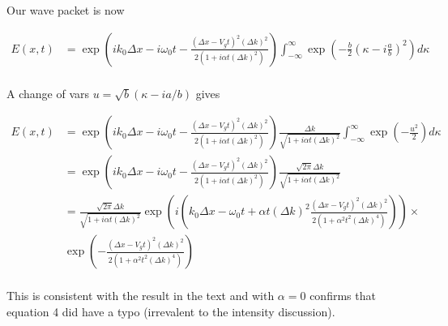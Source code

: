 \documentclass{article}
\newcommand{\IIinf}[0]{ \int_{-\infty}^\infty }
\begin{document}
Our wave packet is now

\begin{align*}
E(x,t) 
&= \exp\left( i k_0 \Delta x -i \omega_0 t - \frac{( \Delta x - V_g t)^2 (\Delta k)^2}{2(1 + i \alpha t (\Delta k)^2)} \right)
\IIinf 
\exp\left( - \frac{b}{2}\left( \kappa - i \frac{a}{b} \right)^2 \right) 
d\kappa \\
\end{align*}

A change of vars $u = \sqrt{b}(\kappa - ia/b)$ gives

\begin{align*}
E(x,t) 
&= \exp\left( i k_0 \Delta x -i \omega_0 t - \frac{( \Delta x - V_g t)^2 (\Delta k)^2}{2(1 + i \alpha t (\Delta k)^2)} \right)
\frac{\Delta k}{\sqrt{1 + i \alpha t (\Delta k)^2}}
\IIinf \exp\left( - \frac{u^2}{2} \right) d\kappa \\
&= \exp\left( i k_0 \Delta x -i \omega_0 t - \frac{( \Delta x - V_g t)^2 (\Delta k)^2}{2(1 + i \alpha t (\Delta k)^2)} \right)
\frac{\sqrt{2\pi}\Delta k}{\sqrt{1 + i \alpha t (\Delta k)^2}} \\
&= 
\frac{\sqrt{2\pi}\Delta k}{\sqrt{1 + i \alpha t (\Delta k)^2}} 
\exp\left( i \left(k_0 \Delta x - \omega_0 t
+ 
\alpha t (\Delta k)^2 \frac{( \Delta x - V_g t)^2 (\Delta k)^2}{2(1 + \alpha^2 t^2 (\Delta k)^4)} 
\right) \right) \times \\
&\exp\left(
- 
\frac{( \Delta x - V_g t)^2 (\Delta k)^2}{2(1 + \alpha^2 t^2 (\Delta k)^4)} 
\right) \\
\end{align*}

This is consistent with the result in the text and with $\alpha = 0$ confirms that equation 4 did have a typo (irrevalent to the
intensity discussion).




\end{document}
